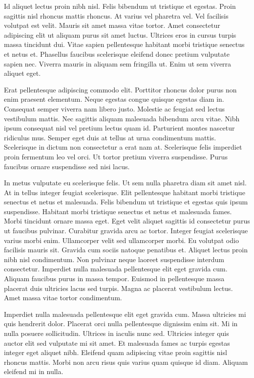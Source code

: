 \documentclass[12pt]{article}
\begin{document}
Id aliquet lectus proin nibh nisl. Felis bibendum ut tristique et egestas. Proin sagittis nisl rhoncus mattis rhoncus. At varius vel pharetra vel. Vel facilisis volutpat est velit. Mauris sit amet massa vitae tortor. Amet consectetur adipiscing elit ut aliquam purus sit amet luctus. Ultrices eros in cursus turpis massa tincidunt dui. Vitae sapien pellentesque habitant morbi tristique senectus et netus et. Phasellus faucibus scelerisque eleifend donec pretium vulputate sapien nec. Viverra mauris in aliquam sem fringilla ut. Enim ut sem viverra aliquet eget.

Erat pellentesque adipiscing commodo elit. Porttitor rhoncus dolor purus non enim praesent elementum. Neque egestas congue quisque egestas diam in. Consequat semper viverra nam libero justo. Molestie ac feugiat sed lectus vestibulum mattis. Nec sagittis aliquam malesuada bibendum arcu vitae. Nibh ipsum consequat nisl vel pretium lectus quam id. Parturient montes nascetur ridiculus mus. Semper eget duis at tellus at urna condimentum mattis. Scelerisque in dictum non consectetur a erat nam at. Scelerisque felis imperdiet proin fermentum leo vel orci. Ut tortor pretium viverra suspendisse. Purus faucibus ornare suspendisse sed nisi lacus.

In metus vulputate eu scelerisque felis. Ut sem nulla pharetra diam sit amet nisl. At in tellus integer feugiat scelerisque. Elit pellentesque habitant morbi tristique senectus et netus et malesuada. Felis bibendum ut tristique et egestas quis ipsum suspendisse. Habitant morbi tristique senectus et netus et malesuada fames. Morbi tincidunt ornare massa eget. Eget velit aliquet sagittis id consectetur purus ut faucibus pulvinar. Curabitur gravida arcu ac tortor. Integer feugiat scelerisque varius morbi enim. Ullamcorper velit sed ullamcorper morbi. Eu volutpat odio facilisis mauris sit. Gravida cum sociis natoque penatibus et. Aliquet lectus proin nibh nisl condimentum. Non pulvinar neque laoreet suspendisse interdum consectetur. Imperdiet nulla malesuada pellentesque elit eget gravida cum. Aliquam faucibus purus in massa tempor. Euismod in pellentesque massa placerat duis ultricies lacus sed turpis. Magna ac placerat vestibulum lectus. Amet massa vitae tortor condimentum.

Imperdiet nulla malesuada pellentesque elit eget gravida cum. Massa ultricies mi quis hendrerit dolor. Placerat orci nulla pellentesque dignissim enim sit. Mi in nulla posuere sollicitudin. Ultrices in iaculis nunc sed. Ultricies integer quis auctor elit sed vulputate mi sit amet. Et malesuada fames ac turpis egestas integer eget aliquet nibh. Eleifend quam adipiscing vitae proin sagittis nisl rhoncus mattis. Morbi non arcu risus quis varius quam quisque id diam. Aliquam eleifend mi in nulla.
\end{document}
